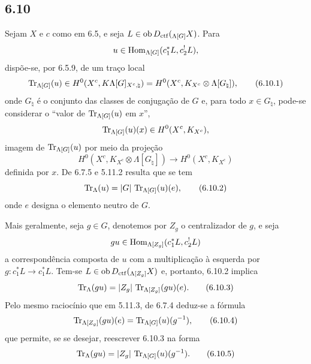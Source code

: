 \subsection*{6.10}
Sejam $X$ e $c$ como em 6.5, e seja $L\in\operatorname{ob} D_{\mathrm{ctf}}({}_{\Lambda[G]}X)$. Para
\[
u\in\operatorname{Hom}_{\Lambda[G]}(c_1^*L,c_2^!L),
\]
dispõe-se, por 6.5.9, de um traço local
\begin{equation}
\operatorname{Tr}_{\Lambda[G]}(u)\in
H^0(X^c,K\Lambda[G]_{X^c,\natural})
=H^0(X^c,K_{X^c}\otimes\Lambda[G_{\natural}]),
\tag{6.10.1}
\end{equation}
onde $G_{\natural}$ é o conjunto das classes de conjugação de $G$ e, para todo $x\in G_{\natural}$, pode-se considerar o ``valor de $\operatorname{Tr}_{\Lambda[G]}(u)$ em $x$'',
\[
\operatorname{Tr}_{\Lambda[G]}(u)(x)\in H^0(X^c,K_{X^c}),
\]
imagem de $\operatorname{Tr}_{\Lambda[G]}(u)$ por meio da projeção
\[
H^0(X^c,K_{X^c}\otimes\Lambda[G_{\natural}])
\longrightarrow H^0(X^c,K_{X^c})
\]
definida por $x$. De 6.7.5 e 5.11.2 resulta que se tem
\begin{equation}
\operatorname{Tr}_{\Lambda}(u)=|G|\,\operatorname{Tr}_{\Lambda[G]}(u)(e),
\tag{6.10.2}
\end{equation}
onde $e$ designa o elemento neutro de $G$.

Mais geralmente, seja $g\in G$, denotemos por $Z_g$ o centralizador de $g$, e seja
\[
gu\in\operatorname{Hom}_{\Lambda[Z_g]}(c_1^*L,c_2^!L)
\]
a correspondência composta de $u$ com a multiplicação à esquerda por $g:c_1^*L\to c_1^*L$. Tem-se $L\in\operatorname{ob} D_{\mathrm{ctf}}({}_{\Lambda[Z_g]}X)$ e, portanto, 6.10.2 implica
\begin{equation}
\operatorname{Tr}_{\Lambda}(gu)=|Z_g|\,\operatorname{Tr}_{\Lambda[Z_g]}(gu)(e).
\tag{6.10.3}
\end{equation}
Pelo mesmo raciocínio que em 5.11.3, de 6.7.4 deduz-se a fórmula
\begin{equation}
\operatorname{Tr}_{\Lambda[Z_g]}(gu)(e)=\operatorname{Tr}_{\Lambda[G]}(u)(g^{-1}),
\tag{6.10.4}
\end{equation}
que permite, se se desejar, reescrever 6.10.3 na forma
\begin{equation}
\operatorname{Tr}_{\Lambda}(gu)=|Z_g|\,\operatorname{Tr}_{\Lambda[G]}(u)(g^{-1}).
\tag{6.10.5}
\end{equation}
